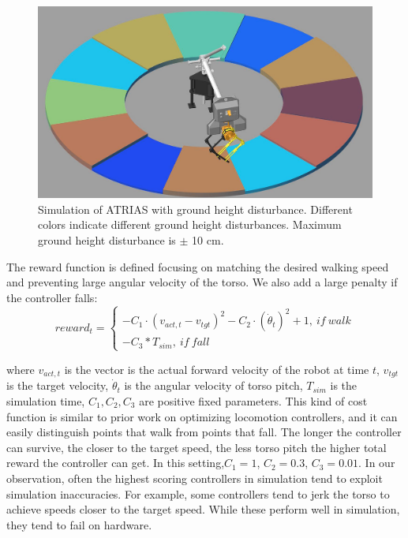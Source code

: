 \begin{figure}[t]
	\centering
	\includegraphics[width=.55\textwidth]{img/simulator.PNG}
    \caption{Simulation of ATRIAS with ground height disturbance. Different colors indicate different ground height disturbances. Maximum ground height disturbance is $\pm$ 10 cm. }
    \label{fig:process}
\end{figure}

The reward function is defined focusing on matching the desired walking speed and preventing large angular velocity of the torso. We also add a large penalty if the controller falls:
\begin{equation}
reward_t=\left\{
\begin{array}{rcl}
-C_1\cdot(v_{act, t}-v_{tgt})^2 -C_2\cdot(\dot{\theta}_t)^2 + 1 ,\  {if \ walk}\\
-C_3*T_{sim}, \  {if \ fall}
\end{array} \right.
\label{reward_1}
\end{equation}

where $v_{act, t}$ is the vector is the actual forward velocity of the robot at time $t$, $v_{tgt}$ is the target velocity, $\dot{\theta}_t$ is the angular velocity of torso pitch, $T_{sim}$ is the simulation time, $C_1,C_2,C_3$ are positive fixed parameters. This kind of cost function is similar to prior work on optimizing locomotion controllers, and it can easily distinguish points that walk from points that fall. The longer the controller can survive, the closer to the target speed, the less torso pitch the higher total reward the controller can get.
In this setting,$C_1 = 1$, $C_2=0.3$, $C_3=0.01$.
In our observation, often the highest scoring controllers in simulation tend to exploit simulation inaccuracies. For example, some controllers tend to jerk the torso to achieve speeds closer to the target speed. While these perform well in simulation, they tend to fail on hardware. 


